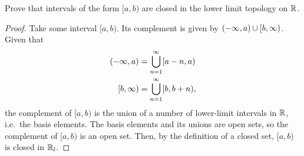 \documentclass[twocolumn, noxcolor, maketitle]{mathnotes-hw}
\begin{document}
\begin{problem}[1.32]
  Prove that intervals of the form $[a, b)$ are closed in the lower limit
  topology on $\mathbb{R}$.
\end{problem}
\begin{proof}
  Take some interval $[a, b)$. Its complement is given by $(-\infty, a) \cup
  [b, \infty)$. Given that
  \begin{alignat*}{1}
    (-\infty, a) &= \bigcup_{n=1}^\infty [a-n, a) \\
    [b, \infty) &= \bigcup_{n=1}^\infty [b, b+n),
  \end{alignat*}
  the complement of $[a, b)$ is the union of a number of lower-limit intervals
  in $\mathbb{R}$, i.e.~the basis elements. The basis elements and its unions are open
  sets, so the complement of $[a, b)$ is an open set. Then, by the definition of
  a closed set, $[a, b)$ is closed in $\mathbb{R}_l$.
\end{proof}
\end{document}
